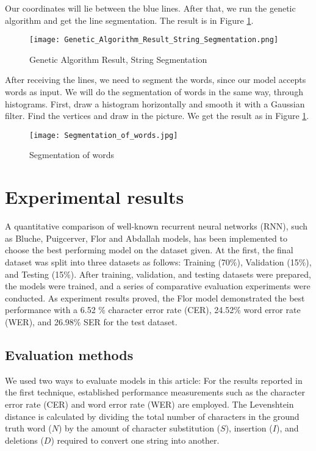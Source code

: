 \documentclass[preprint,12pt]{elsarticle}
\begin{document}
Our coordinates will lie between the blue lines. After that, we run the genetic algorithm and get the line segmentation. The result is in Figure \ref{fig:segm4}.
\begin{figure}[!ht]
    \centering
    \texttt{[image: Genetic\_Algorithm\_Result\_String\_Segmentation.png]}
    \caption{Genetic Algorithm Result, String Segmentation}
    \label{fig:segm4}
\end{figure}

After receiving the lines, we need to segment the words, since our model accepts words as input. We will do the segmentation of words in the same way, through histograms. First, draw a histogram horizontally and smooth it with a Gaussian filter. Find the vertices and draw in the picture. We get the result as in Figure \ref{fig:segm4}.
\begin{figure}[!ht]
    \centering
    \texttt{[image: Segmentation\_of\_words.jpg]}
    \caption{Segmentation of words}
    \label{fig:segm5}
\end{figure}



\section{Experimental results}
\label{section:Experimental}

A quantitative comparison of well-known recurrent neural networks (RNN), such as Bluche\cite{bluche2017gated}, Puigcerver\cite{puigcerver2017multidimensional}, Flor \cite{de2020htr} and Abdallah\cite{Abdallah_2020} models, has been implemented to choose the best performing model on the dataset given. At the first, the final dataset was split into three datasets as follows: Training (70\%), Validation (15\%), and Testing (15\%).  After training, validation, and testing datasets were prepared, the models were trained, and a series of comparative evaluation experiments were conducted. As experiment results proved, the Flor model demonstrated the best performance with a 6.52 \% character error rate (CER), 24.52\% word error rate (WER), and 26.98\% SER  for the test dataset.

\subsection{Evaluation methods}
We used two ways to evaluate models in this article: For the results reported in the first technique, established performance measurements such as the character error rate (CER) and word error rate (WER)\cite{frinken2014continuous} are employed. The Levenshtein distance is calculated by dividing the total number of characters in the ground truth word ($N$) by the amount of character substitution ($S$), insertion ($I$), and deletions ($D$) required to convert one string into another.
\end{document}
